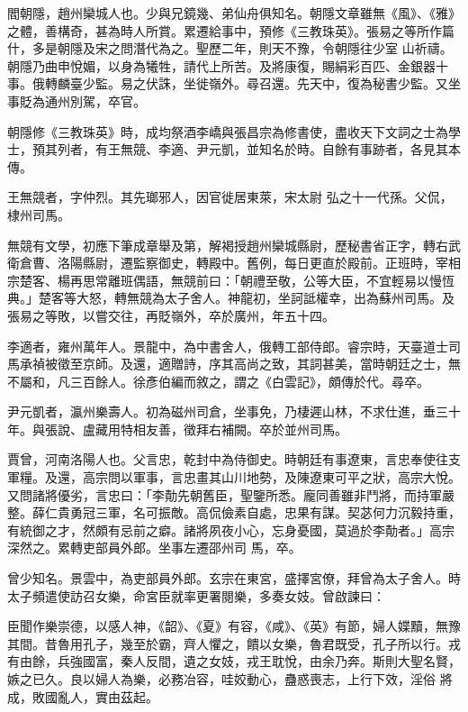 \begin{pinyinscope}
 閻朝隱，趙州欒城人也。少與兄鏡幾、弟仙舟俱知名。朝隱文章雖無《風》、《雅》之體，善構奇，甚為時人所賞。累遷給事中，預修《三教珠英》。張易之等所作篇什，多是朝隱及宋之問潛代為之。聖歷二年，則天不豫，令朝隱往少室
 山祈禱。朝隱乃曲申悅媚，以身為犧牲，請代上所苦。及將康復，賜絹彩百匹、金銀器十事。俄轉麟臺少監。易之伏誅，坐徙嶺外。尋召還。先天中，復為秘書少監。又坐事貶為通州別駕，卒官。



 朝隱修《三教珠英》時，成均祭酒李嶠與張昌宗為修書使，盡收天下文詞之士為學士，預其列者，有王無競、李適、尹元凱，並知名於時。自餘有事跡者，各見其本傳。



 王無競者，字仲烈。其先瑯邪人，因官徙居東萊，宋太尉
 弘之十一代孫。父侃，棣州司馬。



 無競有文學，初應下筆成章舉及第，解褐授趙州欒城縣尉，歷秘書省正字，轉右武衛倉曹、洛陽縣尉，遷監察御史，轉殿中。舊例，每日更直於殿前。正班時，宰相宗楚客、楊再思常離班偶語，無競前曰：「朝禮至敬，公等大臣，不宜輕易以慢恆典。」楚客等大怒，轉無競為太子舍人。神龍初，坐訶詆權幸，出為蘇州司馬。及張易之等敗，以嘗交往，再貶嶺外，卒於廣州，年五十四。



 李適者，雍州萬年人。景龍中，為中書舍人，俄轉工部侍郎。睿宗時，天臺道士司馬承禎被徵至京師。及還，適贈詩，序其高尚之致，其詞甚美，當時朝廷之士，無不屬和，凡三百餘人。徐彥伯編而敘之，謂之《白雲記》，頗傳於代。尋卒。



 尹元凱者，瀛州樂壽人。初為磁州司倉，坐事免，乃棲遲山林，不求仕進，垂三十年。與張說、盧藏用特相友善，徵拜右補闕。卒於並州司馬。



 賈曾，河南洛陽人也。父言忠，乾封中為侍御史。時朝廷有事遼東，言忠奉使往支軍糧。及還，高宗問以軍事，言忠畫其山川地勢，及陳遼東可平之狀，高宗大悅。又問諸將優劣，言忠曰：「李勣先朝舊臣，聖鑒所悉。龐同善雖非鬥將，而持軍嚴整。薛仁貴勇冠三軍，名可振敵。高侃儉素自處，忠果有謀。契苾何力沉毅持重，有統御之才，然頗有忌前之癖。諸將夙夜小心，忘身憂國，莫過於李勣者。」高宗深然之。累轉吏部員外郎。坐事左遷邵州司
 馬，卒。



 曾少知名。景雲中，為吏部員外郎。玄宗在東宮，盛擇宮僚，拜曾為太子舍人。時太子頻遣使訪召女樂，命宮臣就率更署閱樂，多奏女妓。曾啟諫曰：



 臣聞作樂崇德，以感人神，《韶》、《夏》有容，《咸》、《英》有節，婦人媟黷，無豫其間。昔魯用孔子，幾至於霸，齊人懼之，饋以女樂，魯君既受，孔子所以行。戎有由餘，兵強國富，秦人反間，遺之女妓，戎王耽悅，由余乃奔。斯則大聖名賢，嫉之已久。良以婦人為樂，必務冶容，哇姣動心，蠱惑喪志，上行下效，淫俗
 將成，敗國亂人，實由茲起。




\end{pinyinscope}
